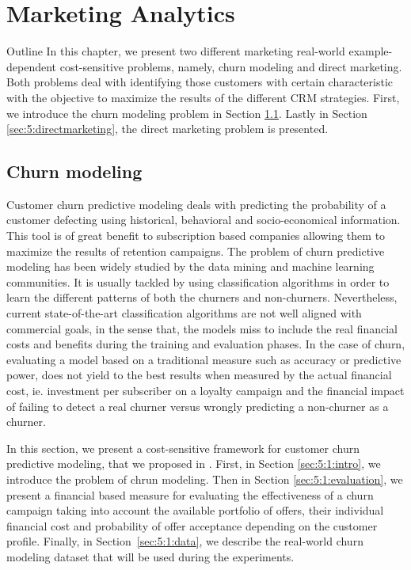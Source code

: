\chapter{Marketing Analytics}\label{ch:5}

\begin{remark}{Outline}
In this chapter, we present two different marketing real-world example-dependent 
cost-sensitive problems, namely, churn modeling and direct marketing. Both problems deal 
with identifying those customers with certain characteristic with the objective to maximize the 
results of the different CRM strategies.
First, we introduce the churn modeling problem in Section \ref{sec:5:churn}. Lastly in Section 
\ref{sec:5:directmarketing}, the direct marketing problem is presented.
\end{remark}


\section{Churn modeling}
\label{sec:5:churn}

Customer churn predictive modeling deals with predicting the probability of a customer defecting 
using historical, behavioral and socio-economical information. This tool is of great benefit to 
subscription based companies allowing them to maximize the results of retention campaigns. The 
problem of churn predictive modeling has been widely studied by the data mining and machine learning
communities. It is usually tackled by using classification algorithms in order to learn the 
different patterns of both the churners and non-churners. Nevertheless, current state-of-the-art 
classification algorithms are not well aligned with commercial goals, in the sense that, the models 
miss to include the real financial costs and benefits during the training and evaluation phases. In 
the case of churn, evaluating a model based on a traditional measure such as accuracy or predictive 
power, does not yield to the best results when measured by the actual financial cost, ie. 
investment per subscriber on a loyalty campaign and the financial impact of failing to detect a 
real churner versus wrongly predicting a non-churner as a churner.

In this section, we present a cost-sensitive framework for customer churn predictive modeling, 
that we proposed in \citep{CorreaBahnsen2015a}. First, in Section \ref{sec:5:1:intro}, we introduce 
the problem of chrun modeling. Then in Section \ref{sec:5:1:evaluation}, we present a financial 
based measure for evaluating the effectiveness of a churn campaign taking into account the 
available 
portfolio of offers, their individual financial cost and probability of offer acceptance depending 
on the customer profile. Finally, in Section~\ref{sec:5:1:data}, we describe the real-world churn 
modeling dataset that will be used during the experiments.


